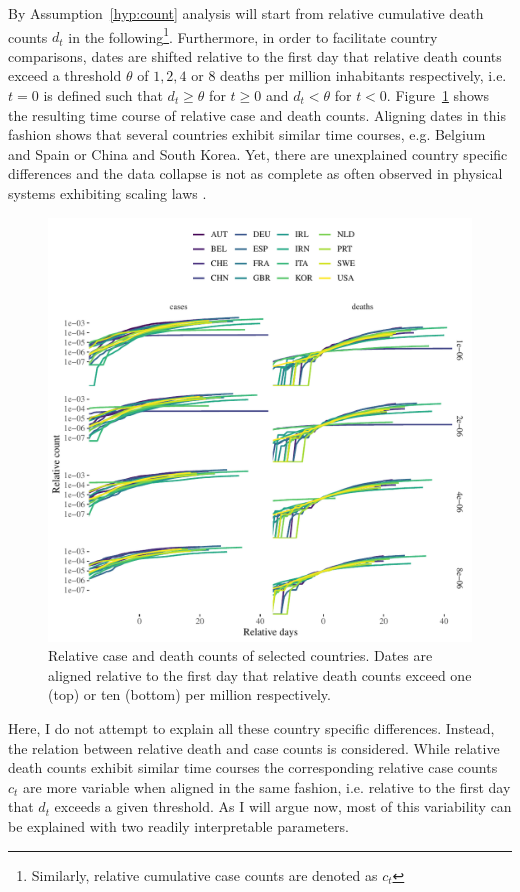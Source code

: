 \documentclass[fullpage,a4paper]{article}
\newcommand{\fig}[1]{Figure~\ref{fig:#1}}
\newcommand{\hyp}[1]{Assumption~\ref{hyp:#1}}
\begin{document}
By \hyp{count} analysis will start from relative cumulative death
counts $d_t$ in the following\footnote{Similarly, relative cumulative
  case counts are denoted as $c_t$}. Furthermore, in order to
facilitate country comparisons, dates are shifted relative to the
first day that relative death counts exceed a threshold $\theta$ of
$1, 2, 4$ or $8$ deaths per million inhabitants respectively, i.e. $t
= 0$ is defined such that $d_t \geq \theta$ for $t \geq 0$ and $d_t <
\theta$ for $t < 0$. \fig{aligned_data} shows the resulting time
course of relative case and death counts. Aligning dates in this
fashion shows that several countries exhibit similar time courses,
e.g. Belgium and Spain or China and South Korea. Yet, there are
unexplained country specific differences and the data collapse is not
as complete as often observed in physical systems exhibiting scaling
laws \cite{stanley99}.
\begin{figure}
  \includegraphics[width=1\textwidth]{../figs/ecdc_align_all.pdf}
  \caption{\label{fig:aligned_data} Relative case and death counts of
    selected countries. Dates are aligned relative to the first day
    that relative death counts exceed one (top) or ten (bottom) per
    million respectively.}
\end{figure}

Here, I do not attempt to explain all these country specific
differences. Instead, the relation between relative death and case
counts is considered. While relative death counts exhibit similar time
courses the corresponding relative case counts $c_t$ are more variable
when aligned in the same fashion, i.e. relative to the first day that
$d_t$ exceeds a given threshold. As I will argue now, most of this
variability can be explained with two readily interpretable
parameters.
\end{document}
